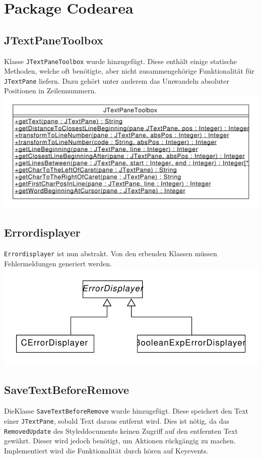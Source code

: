 \documentclass[a4paper]{scrreprt}
\begin{document}
\section{Package Codearea}
\subsection{JTextPaneToolbox}
Klasse \verb!JTextPaneToolbox! wurde hinzugefügt. Diese enthält einige statische Methoden, welche oft benötigte, aber nicht zusammengehörige Funktionalität für \verb!JTextPane! liefern. Dazu gehört unter anderem das Umwandeln absoluter Positionen in Zeilennummern.\\
\includegraphics[scale=0.5]{JTextPaneToolbox.pdf}\\
\subsection{Errordisplayer}
\verb!Errordisplayer! ist nun abstrakt. Von den erbenden Klassen müssen Fehlermeldungen generiert werden.\\
\includegraphics[scale=0.5]{Errordisplayer_update.pdf}\\
\subsection{SaveTextBeforeRemove}
DieKlasse \verb!SaveTextBeforeRemove! wurde hinzugefügt. Diese speichert den Text einer \verb!JTextPane!, sobald Text daraus entfernt wird. Dies ist nötig, da das \verb!RemovedUpdate! des Styleddocuments keinen Zugriff auf den entfernten Text gewährt. Dieser wird jedoch benötigt, um Aktionen rückgängig zu machen. Implementiert wird die Funktionalität durch hören auf Keyevents.\\
\end{document}
